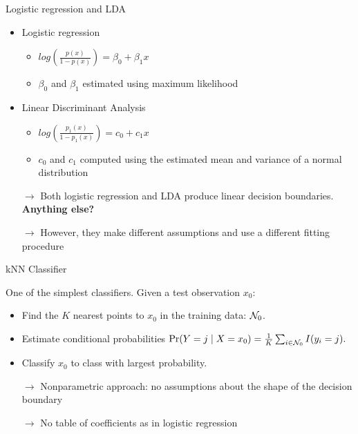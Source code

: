 \documentclass[14pt]{beamer}
\begin{document}
\begin{frame}{Logistic regression and LDA}

\begin{itemize}
	
	\item Logistic regression
	\begin{itemize}
	\item $log(\frac{p(x)}{1 - p(x)}) = \beta_0 + \beta_1 x$
	\item $\beta_0$ and $\beta_1$ estimated using maximum likelihood
	\end{itemize}
	
	\item Linear Discriminant Analysis
	\begin{itemize}
	\item $log(\frac{p_1(x)}{1 - p_1(x)}) = c_0 + c_1 x$
	\item $c_0$ and $c_1$ computed using the estimated mean and variance of a normal distribution
	\end{itemize}
	
	\item[$\rightarrow$] Both logistic regression and LDA produce linear decision boundaries. \textbf{Anything else?} \pause
	\item[$\rightarrow$] However, they make different assumptions and use a different fitting procedure 
	
\end{itemize}
\end{frame}


\begin{frame}{kNN Classifier}

One of the simplest classifiers. Given a test observation $x_0$:
\begin{itemize}
\item Find the $K$ nearest points to $x_0$ in the training data: ${\cal N}_0$.
\item Estimate conditional probabilities
$\text{Pr}(Y=j \mid X=x_0) = \frac{1}{K}\sum_{i\in {\cal N}_0} I(y_i = j).$
\item Classify $x_0$ to class with largest probability.
\item[$\rightarrow$] Nonparametric approach: no assumptions about the shape of the decision boundary
\item[$\rightarrow$] No table of coefficients as in logistic regression
\end{itemize}
\end{frame}
\end{document}
